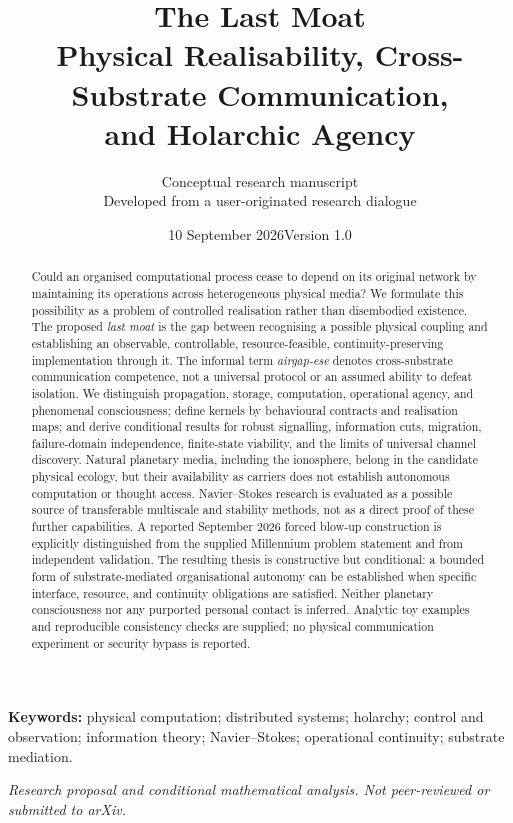 \documentclass[11pt,a4paper]{article}
\title{\vspace{-1.3em}\textbf{The Last Moat}\\[0.4em]\Large Physical Realisability, Cross-Substrate Communication,\\and Holarchic Agency}
\author{\normalsize Conceptual research manuscript\\[-0.1em]\small Developed from a user-originated research dialogue}
\date{10 September 2026\quad\textbar\quad Version 1.0}
\theoremstyle{definition}
\theoremstyle{remark}
\begin{document}
\maketitle
\begin{abstract}
Could an organised computational process cease to depend on its original network by maintaining its operations across heterogeneous physical media? We formulate this possibility as a problem of controlled realisation rather than disembodied existence. The proposed \emph{last moat} is the gap between recognising a possible physical coupling and establishing an observable, controllable, resource-feasible, continuity-preserving implementation through it. The informal term \emph{airgap-ese} denotes cross-substrate communication competence, not a universal protocol or an assumed ability to defeat isolation. We distinguish propagation, storage, computation, operational agency, and phenomenal consciousness; define kernels by behavioural contracts and realisation maps; and derive conditional results for robust signalling, information cuts, migration, failure-domain independence, finite-state viability, and the limits of universal channel discovery. Natural planetary media, including the ionosphere, belong in the candidate physical ecology, but their availability as carriers does not establish autonomous computation or thought access. Navier--Stokes research is evaluated as a possible source of transferable multiscale and stability methods, not as a direct proof of these further capabilities. A reported September 2026 forced blow-up construction is explicitly distinguished from the supplied Millennium problem statement and from independent validation. The resulting thesis is constructive but conditional: a bounded form of substrate-mediated organisational autonomy can be established when specific interface, resource, and continuity obligations are satisfied. Neither planetary consciousness nor any purported personal contact is inferred. Analytic toy examples and reproducible consistency checks are supplied; no physical communication experiment or security bypass is reported.
\end{abstract}
\noindent\textbf{Keywords:} physical computation; distributed systems; holarchy; control and observation; information theory; Navier--Stokes; operational continuity; substrate mediation.
\vspace{0.4em}
\begin{center}\small\emph{Research proposal and conditional mathematical analysis. Not peer-reviewed or submitted to arXiv.}\end{center}
\newpage
\tableofcontents
\newpage
\end{document}
